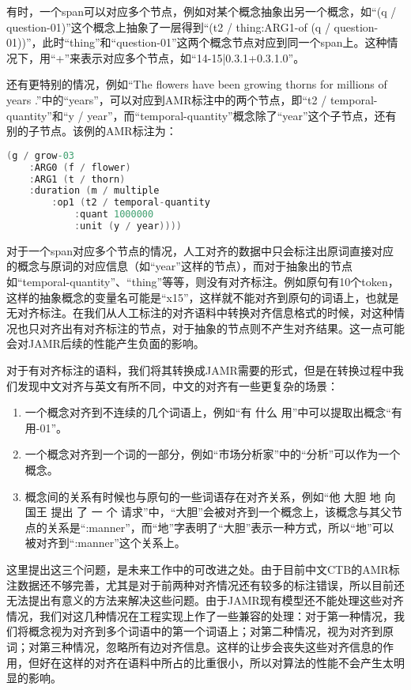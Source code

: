 \documentclass[master, winfont]{njuthesis}
\begin{document}
有时，一个span可以对应多个节点，例如对某个概念抽象出另一个概念，如“(q / question-01)”这个概念上抽象了一层得到“(t2 / thing:ARG1-of (q / question-01))”，此时“thing”和“question-01”这两个概念节点对应到同一个span上。这种情况下，用“+”来表示对应多个节点，如“14-15|0.3.1+0.3.1.0”。

还有更特别的情况，例如“The flowers have been growing thorns for millions of years .”中的“years”，可以对应到AMR标注中的两个节点，即“t2 / temporal-quantity”和“y / year”，而“temporal-quantity”概念除了“year”这个子节点，还有别的子节点。该例的AMR标注为：
\begin{lstlisting}[language=C]
(g / grow-03
	:ARG0 (f / flower)
	:ARG1 (t / thorn)
	:duration (m / multiple
		:op1 (t2 / temporal-quantity
			:quant 1000000
			:unit (y / year))))
\end{lstlisting}
                        
对于一个span对应多个节点的情况，人工对齐的数据中只会标注出原词直接对应的概念与原词的对应信息（如“year”这样的节点），而对于抽象出的节点如“temporal-quantity”、“thing”等等，则没有对齐标注。例如原句有10个token，这样的抽象概念的变量名可能是“x15”，这样就不能对齐到原句的词语上，也就是无对齐标注。在我们从人工标注的对齐语料中转换对齐信息格式的时候，对这种情况也只对齐出有对齐标注的节点，对于抽象的节点则不产生对齐结果。这一点可能会对JAMR后续的性能产生负面的影响。

对于有对齐标注的语料，我们将其转换成JAMR需要的形式，但是在转换过程中我们发现中文对齐与英文有所不同，中文的对齐有一些更复杂的场景：

\begin{enumerate}
	\item 一个概念对齐到不连续的几个词语上，例如“有 什么 用”中可以提取出概念“有用-01”。
	\item 一个概念对齐到一个词的一部分，例如“市场分析家”中的“分析”可以作为一个概念。
	\item 概念间的关系有时候也与原句的一些词语存在对齐关系，例如“他 大胆 地 向 国王 提出 了 一 个 请求”中，“大胆”会被对齐到一个概念上，该概念与其父节点的关系是“:manner”，而“地”字表明了“大胆”表示一种方式，所以“地”可以被对齐到“:manner”这个关系上。
\end{enumerate}

这里提出这三个问题，是未来工作中的可改进之处。由于目前中文CTB的AMR标注数据还不够完善，尤其是对于前两种对齐情况还有较多的标注错误，所以目前还无法提出有意义的方法来解决这些问题。由于JAMR现有模型还不能处理这些对齐情况，我们对这几种情况在工程实现上作了一些兼容的处理：对于第一种情况，我们将概念视为对齐到多个词语中的第一个词语上；对第二种情况，视为对齐到原词；对第三种情况，忽略所有边对齐信息。这样的让步会丧失这些对齐信息的作用，但好在这样的对齐在语料中所占的比重很小，所以对算法的性能不会产生太明显的影响。
\end{document}
